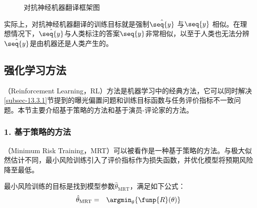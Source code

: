 \begin{figure}[htp]
\centering

\caption{对抗神经机器翻译框架图}
\label{fig:13-10}
\end{figure}

\parinterval 实际上，对抗神经机器翻译的训练目标就是强制$\hat{\seq{y}}$ 与$\seq{y}$ 相似。在理想情况下，$\hat{\seq{y}}$与人类标注的答案$\seq{y}$非常相似，以至于人类也无法分辨$\hat{\seq{y}}$是由机器还是人类产生的。


\subsection{强化学习方法}

（Reinforcement Learning，RL）方法是机器学习中的经典方法，它可以同时解决\ref{subsec-13.3.1}节提到的曝光偏置问题和训练目标函数与任务评价指标不一致问题。本节主要介绍基于策略的方法和基于演员-评论家的方法。


\subsubsection{1. 基于策略的方法}

（Minimum Risk Training，MRT）可以被看作是一种基于策略的方法。与极大似然估计不同，最小风险训练引入了评价指标作为损失函数，并优化模型将预期风险降至最低。

\parinterval 最小风险训练的目标是找到模型参数$\hat{\theta}_{\textrm{MRT}} $，满足如下公式：
\begin{eqnarray}
\hat{\theta}_{\textrm{MRT}} & = & \argmin_{\theta}\{\funp{R}(\theta)\} \label{eq:13-13}
\end{eqnarray}

